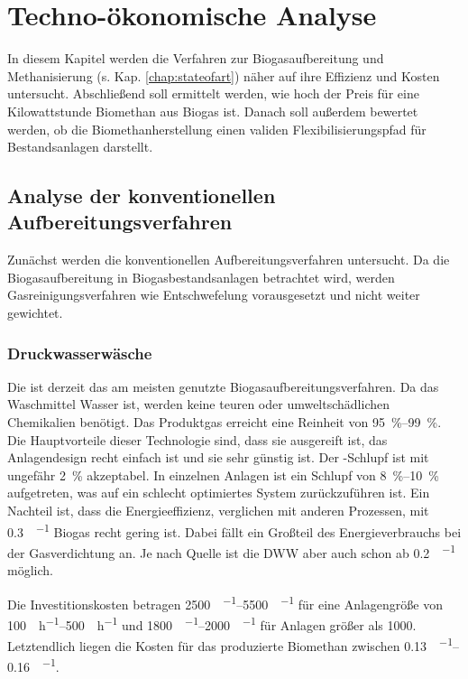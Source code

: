 
\section{Techno-ökonomische Analyse}\label{chap:chap_tececon}

In diesem Kapitel werden die Verfahren zur Biogasaufbereitung und Methanisierung (s. Kap. \ref{chap:stateofart}) näher auf ihre Effizienz und Kosten untersucht. Abschließend soll ermittelt werden, wie hoch der Preis für eine Kilowattstunde Biomethan aus Biogas ist. Danach soll außerdem bewertet werden, ob die Biomethanherstellung einen validen Flexibilisierungspfad für Bestandsanlagen darstellt. 

\subsection{Analyse der konventionellen Aufbereitungsverfahren}
Zunächst werden die konventionellen Aufbereitungsverfahren untersucht. Da die Biogasaufbereitung in Biogasbestandsanlagen betrachtet wird, werden Gasreinigungsverfahren wie Entschwefelung vorausgesetzt und nicht weiter gewichtet.  \smallskip


\subsubsection{Druckwasserwäsche}
Die  ist derzeit das am meisten genutzte Biogasaufbereitungsverfahren. Da das Waschmittel Wasser ist, werden keine teuren oder umweltschädlichen Chemikalien benötigt. Das Produktgas erreicht eine  Reinheit von \SIrange{95}{99}{\percent}. Die Hauptvorteile dieser Technologie sind, dass sie ausgereift ist, das Anlagendesign recht einfach ist und sie sehr günstig ist. Der -Schlupf ist mit ungefähr \SI{2}{\percent} akzeptabel. In einzelnen Anlagen ist ein Schlupf von \SIrange{8}{10}{\percent} aufgetreten, was auf ein schlecht optimiertes System zurückzuführen ist. Ein Nachteil ist, dass die Energieeffizienz, verglichen mit anderen Prozessen, mit \SI{0,3}{\kwh\per\normvol} Biogas recht gering ist. Dabei fällt ein Großteil des Energieverbrauchs bei der Gasverdichtung an. Je nach Quelle ist die \gls{DWW} aber auch schon ab \SI{0,2}{\kwh\per\normvol} möglich. \parencite{Emp18} \parencite{Coll17}\smallskip

Die Investitionskosten betragen \SIrange{2500}{5500}{\sieuro\per\normvolh} für eine Anlagengröße von \SIrange{100}{500}{\normvol\per\hour} und \SIrange{1800}{2000}{\sieuro\per\normvolh} für Anlagen größer als \SI{1000}{\normvolh}. Letztendlich liegen die Kosten für das produzierte Biomethan zwischen \SIrange{0,13}{0,16}{\sieuro\per\normvol}. \parencite{Emp18} \parencite{KGKK2019} \parencite{Struk20}\smallskip

